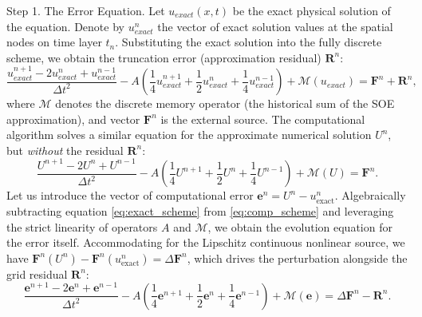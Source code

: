 \documentclass[a4paper,fleqn]{cas-sc}
\begin{document}
\begin{appendix}
Step 1. The Error Equation. 
Let $u_{exact}(x,t)$ be the exact physical solution of the equation. Denote by $u_{exact}^n$ the vector of exact solution values at the spatial nodes on time layer $t_n$. Substituting the exact solution into the fully discrete scheme, we obtain the truncation error (approximation residual) $\boldsymbol{R}^n$:
\begin{equation}\label{eq:exact_scheme}
\frac{u_{exact}^{n+1} - 2u_{exact}^n + u_{exact}^{n-1}}{\Delta t^2} - A \left( \frac{1}{4}u_{exact}^{n+1} + \frac{1}{2}u_{exact}^n + \frac{1}{4}u_{exact}^{n-1} \right) + \mathcal{M}(u_{exact}) = \mathbf{F}^n + \boldsymbol{R}^n,
\end{equation}
where $\mathcal{M}$ denotes the discrete memory operator (the historical sum of the SOE approximation), and vector $\mathbf{F}^n$ is the external source. The computational algorithm solves a similar equation for the approximate numerical solution $U^n$, but \emph{without} the residual $\boldsymbol{R}^n$:
\begin{equation}\label{eq:comp_scheme}
\frac{U^{n+1} - 2U^n + U^{n-1}}{\Delta t^2} - A \left( \frac{1}{4}U^{n+1} + \frac{1}{2}U^n + \frac{1}{4}U^{n-1} \right) + \mathcal{M}(U) = \mathbf{F}^n.
\end{equation}
Let us introduce the vector of computational error $\mathbf{e}^n = U^n - u_{\mathrm{exact}}^n$. Algebraically subtracting equation \eqref{eq:exact_scheme} from \eqref{eq:comp_scheme} and leveraging the strict linearity of operators $A$ and $\mathcal{M}$, we obtain the evolution equation for the error itself. Accommodating for the Lipschitz continuous nonlinear source, we have $\mathbf{F}^n(U^n) - \mathbf{F}^n(u_{\mathrm{exact}}^n) = \Delta\mathbf{F}^n$, which drives the perturbation alongside the grid residual $\boldsymbol{R}^n$:
\begin{equation}\label{eq:error_evol}
\frac{\mathbf{e}^{n+1} - 2\mathbf{e}^n + \mathbf{e}^{n-1}}{\Delta t^2} - A \left( \frac{1}{4}\mathbf{e}^{n+1} + \frac{1}{2}\mathbf{e}^n + \frac{1}{4}\mathbf{e}^{n-1} \right) + \mathcal{M}(\mathbf{e}) = \Delta\mathbf{F}^n - \boldsymbol{R}^n.
\end{equation}


\end{appendix}
\end{document}
